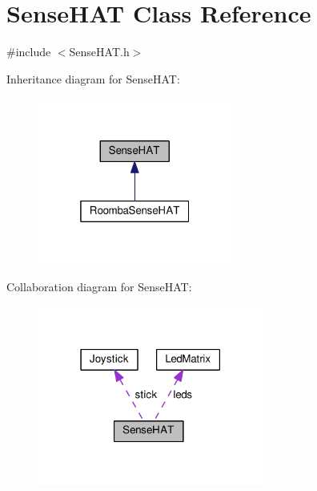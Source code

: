 \hypertarget{class_sense_h_a_t}{}\section{Sense\+H\+AT Class Reference}
\label{class_sense_h_a_t}


{\ttfamily \#include $<$Sense\+H\+A\+T.\+h$>$}



Inheritance diagram for Sense\+H\+AT\+:\nopagebreak
\begin{figure}[H]
\begin{center}
\leavevmode
\includegraphics[width=181pt]{class_sense_h_a_t__inherit__graph}
\end{center}
\end{figure}


Collaboration diagram for Sense\+H\+AT\+:\nopagebreak
\begin{figure}[H]
\begin{center}
\leavevmode
\includegraphics[width=210pt]{class_sense_h_a_t__coll__graph}
\end{center}
\end{figure}
